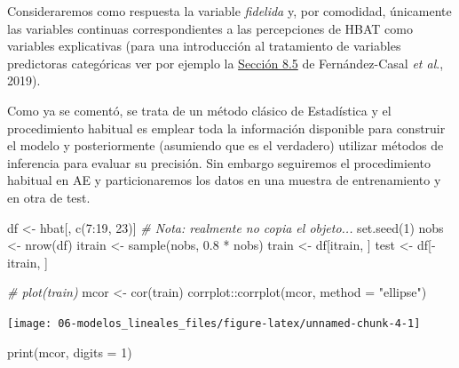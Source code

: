 \documentclass[
]{book}
\newenvironment{Shaded}{\begin{snugshade}}{\end{snugshade}}
\newcommand{\AttributeTok}[1]{\textcolor[rgb]{0.77,0.63,0.00}{#1}}
\newcommand{\CommentTok}[1]{\textcolor[rgb]{0.56,0.35,0.01}{\textit{#1}}}
\newcommand{\DecValTok}[1]{\textcolor[rgb]{0.00,0.00,0.81}{#1}}
\newcommand{\FloatTok}[1]{\textcolor[rgb]{0.00,0.00,0.81}{#1}}
\newcommand{\FunctionTok}[1]{\textcolor[rgb]{0.00,0.00,0.00}{#1}}
\newcommand{\NormalTok}[1]{#1}
\newcommand{\OtherTok}[1]{\textcolor[rgb]{0.56,0.35,0.01}{#1}}
\newcommand{\SpecialCharTok}[1]{\textcolor[rgb]{0.00,0.00,0.00}{#1}}
\newcommand{\StringTok}[1]{\textcolor[rgb]{0.31,0.60,0.02}{#1}}
\theoremstyle{break}
\theoremstyle{definition}
\theoremstyle{definition}
\theoremstyle{definition}
\theoremstyle{definition}
\theoremstyle{remark}
\begin{document}
Consideraremos como respuesta la variable \emph{fidelida} y, por comodidad, únicamente las variables continuas correspondientes a las percepciones de HBAT como variables explicativas (para una introducción al tratamiento de variables predictoras categóricas ver por ejemplo la \href{https://rubenfcasal.github.io/intror/modelos-lineales.html\#regresion-con-variables-categoricas}{Sección 8.5} de Fernández-Casal \emph{et al}., 2019).

Como ya se comentó, se trata de un método clásico de Estadística y el procedimiento habitual es emplear toda la información disponible para construir el modelo y posteriormente (asumiendo que es el verdadero) utilizar métodos de inferencia para evaluar su precisión.
Sin embargo seguiremos el procedimiento habitual en AE y particionaremos los datos en una muestra de entrenamiento y en otra de test.

\begin{Shaded}
\begin{Highlighting}[]
\NormalTok{df }\OtherTok{\textless{}{-}}\NormalTok{ hbat[, }\FunctionTok{c}\NormalTok{(}\DecValTok{7}\SpecialCharTok{:}\DecValTok{19}\NormalTok{, }\DecValTok{23}\NormalTok{)]  }\CommentTok{\# Nota: realmente no copia el objeto...}
\FunctionTok{set.seed}\NormalTok{(}\DecValTok{1}\NormalTok{)}
\NormalTok{nobs }\OtherTok{\textless{}{-}} \FunctionTok{nrow}\NormalTok{(df)}
\NormalTok{itrain }\OtherTok{\textless{}{-}} \FunctionTok{sample}\NormalTok{(nobs, }\FloatTok{0.8} \SpecialCharTok{*}\NormalTok{ nobs)}
\NormalTok{train }\OtherTok{\textless{}{-}}\NormalTok{ df[itrain, ]}
\NormalTok{test }\OtherTok{\textless{}{-}}\NormalTok{ df[}\SpecialCharTok{{-}}\NormalTok{itrain, ]}

\CommentTok{\# plot(train)}
\NormalTok{mcor }\OtherTok{\textless{}{-}} \FunctionTok{cor}\NormalTok{(train)}
\NormalTok{corrplot}\SpecialCharTok{::}\FunctionTok{corrplot}\NormalTok{(mcor, }\AttributeTok{method =} \StringTok{"ellipse"}\NormalTok{)}
\end{Highlighting}
\end{Shaded}

\begin{center}\texttt{[image: 06-modelos\_lineales\_files/figure-latex/unnamed-chunk-4-1]} \end{center}

\begin{Shaded}
\begin{Highlighting}[]
\FunctionTok{print}\NormalTok{(mcor, }\AttributeTok{digits =} \DecValTok{1}\NormalTok{)}
\end{Highlighting}
\end{Shaded}
\end{document}

